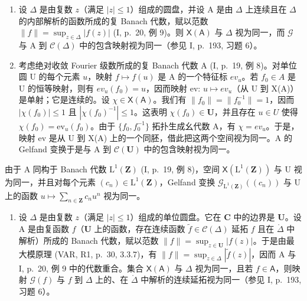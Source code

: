 \begin{enumerate}
\def\labelenumi{\arabic{enumi})}
\setcounter{enumi}{2}
\item
  设 \(\Delta\) 是由复数 \(z\)（满足 \(|z| \leqslant 1\)）组成的圆盘，并设 A 是由 \(\Delta\) 上连续且在 \(\Delta\) 的内部解析的函数所成的复 Banach 代数，赋以范数 \(\|f\| = \sup_{z \in \Delta} |f(z)|\) (I, p.~20, 例 9)。则 \(\mathsf{X}(\mathsf{A})\) 与 \(\Delta\) 视为同一，而 \(\mathcal{G}\) 与 A 到 \(\mathcal{C}(\Delta)\) 中的包含映射视为同一（参见 I, p.~193, 习题 6）。
\item
  考虑绝对收敛 Fourier 级数所成的复 Banach 代数 A (I, p.~19, 例 8)。对单位圆 U 的每个元素 \(u\)，映射 \(f \mapsto f(u)\) 是 A 的一个特征标 \(ev_{u}\)。若 \(f_{0} \in A\) 是 U 的恒等映射，则有 \(ev_{u}(f_{0}) = u\)，因而映射 ev: \(u \mapsto ev_{u}\)（从 U 到 X(A)）是单射；它是连续的。设 \(\chi \in \mathsf{X}(\mathsf{A})\)。我们有 \(\|f_{0}\| = \|f_{0}^{-1}\| = 1\)，因而 \(|\chi(f_{0})| \leqslant 1\) 且 \(|\chi(f_{0})^{-1}| \leqslant 1\)。这表明 \(\chi(f_{0}) \in \mathbf{U}\)，并且存在 \(u \in U\) 使得 \(\chi(f_{0}) = \mathrm{ev}_{u}(f_{0})\)。由于 \(\{f_{0}, f_{0}^{-1}\}\) 拓扑生成幺代数 A，有 \(\chi = ev_{u}\)。于是，映射 ev 是从 U 到 X(A) 上的一个同胚，借此把这两个空间视为同一。A 的 Gelfand 变换于是与 A 到 \(\mathcal{C}(\mathbf{U})\) 中的包含映射视为同一。
\end{enumerate}

由于 A 同构于 Banach 代数 \(\mathrm{L}^{1}(\mathbf{Z})\) (I, p.~19, 例 8)，空间 \(\mathsf{X}(\mathrm{L}^{1}(\mathbf{Z}))\) 与 U 视为同一，并且对每个元素 \((c_{n})\in\mathrm{L}^{1}(\mathbf{Z})\)，Gelfand 变换 \(\mathcal{G}_{\mathrm{L}^{1}(\mathbf{Z})}((c_{n}))\) 与 U 上的函数 \(u\mapsto\sum_{n\in\mathbf{Z}}c_{n}u^{n}\) 视为同一。

\begin{enumerate}
\def\labelenumi{\arabic{enumi})}
\setcounter{enumi}{4}
\tightlist
\item
  设 \(\Delta\) 是由复数 \(z\)（满足 \(|z| \leqslant 1\)）组成的单位圆盘。它在 \(\mathbf{C}\) 中的边界是 \(\mathbf{U}\)。设 A 是由复函数 \(f\)（\(\mathbf{U}\) 上的函数，存在连续函数 \(\widetilde{f} \in \mathcal{C}(\Delta)\) 延拓 \(f\) 且在 \(\mathring{\Delta}\) 中解析）所成的 Banach 代数，赋以范数 \(\|f\| = \sup_{z \in \mathbf{U}} |f(z)|\)。于是由最大模原理 (VAR, R1, p.~30, 3.3.7)，有 \(\|f\| = \sup_{z \in \Delta} |\widetilde{f}(z)|\)，因而 A 与 I, p.~20, 例 9 中的代数重合。集合 \(\mathsf{X}(\mathsf{A})\) 与 \(\Delta\) 视为同一，且若 \(f \in \mathsf{A}\)，则映射 \(\mathcal{G}(f)\) 与 \(f\) 到 \(\Delta\) 上的、在 \(\mathring{\Delta}\) 中解析的连续延拓视为同一（参见 I, p.~193, 习题 6）。
\end{enumerate}

